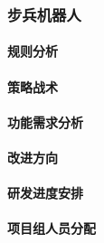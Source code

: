\subsubsection{步兵机器人}

    \paragraph{规则分析}
    
    \paragraph{策略战术}
    
    \paragraph{功能需求分析}
    
    \paragraph{改进方向}

    \paragraph{研发进度安排}

    \paragraph{项目组人员分配}
    